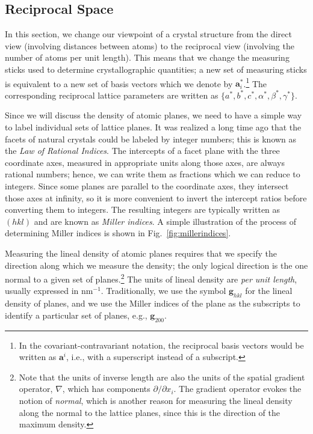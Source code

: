 \subsection{Reciprocal Space}
In this section, we change our viewpoint of a crystal structure from the direct view (involving distances between atoms) to the reciprocal view (involving the number of atoms per unit length).  This means that we change the measuring sticks used to determine crystallographic quantities; a new set of measuring sticks is equivalent to a new set of basis vectors which we denote by $\mathbf{a}^{\ast}_i$.\footnote{In the covariant-contravariant notation, the reciprocal basis vectors would be written as $\mathbf{a}^i$, i.e., with a superscript instead of a subscript.}  The corresponding reciprocal lattice parameters are written as $\{a^{\ast},b^{\ast},c^{\ast},\alpha^{\ast},\beta^{\ast},\gamma^{\ast}\}$.

Since we will discuss the density of atomic planes, we need to have a simple way to label individual sets of lattice planes.  It was realized a long time ago that the facets of natural crystals could be labeled by integer numbers; this is known as the \textit{Law of Rational Indices}.  The intercepts of a facet plane with the three coordinate axes, measured in appropriate units along those axes, are always rational numbers; hence, we can write them as fractions which we can reduce to integers.  Since some planes are parallel to the coordinate axes, they intersect those axes at infinity, so it is more convenient to invert the intercept ratios before converting them to integers.  The resulting integers are typically written as $(hkl)$ and are known as \textit{Miller indices}.  A simple illustration of the process of determining Miller indices is shown in Fig.~\ref{fig:millerindices}.

Measuring the lineal density of atomic planes requires that we specify the direction along which we measure the density; the only logical direction is the one normal to a given set of planes.\footnote{Note that the units of inverse length are also the units of the spatial gradient operator, $\nabla$, which has components $\partial/\partial x_i$.  The gradient operator evokes the notion of \textit{normal}, which is another reason for measuring the lineal density along the normal to the lattice planes, since this is the direction of the maximum density.} The units of lineal density are \textit{per unit length}, usually expressed in nm$^{-1}$.  Traditionally, we use the symbol $\mathbf{g}_{hkl}$ for the lineal density of planes, and we use the Miller indices of the plane as the subscripts to identify a particular set of planes, e.g., $\mathbf{g}_{200}$.

